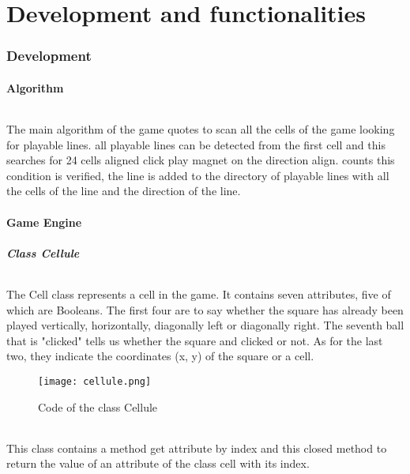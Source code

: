 \documentclass{article}
\begin{document}
\part{Development and functionalities}
\section{Development}
\subsection{Algorithm}
\paragraph{}
\setlength{\parindent}{2cm}
The main algorithm of the game quotes to scan all the cells of the game looking for playable lines. all playable lines can be detected from the first cell and this searches for 24 cells aligned click play magnet on the direction align. counts this condition is verified, the line is added to the directory of playable lines with all the cells of the line and the direction of the line.

\subsection{Game Engine}
\subsubsection{Class Cellule}
\paragraph{}
\setlength{\parindent}{2cm}
 The Cell class represents a cell in the game. It contains seven attributes, five of which are Booleans. The first four are to say whether the square has already been played vertically, horizontally, diagonally left or diagonally right. The seventh ball that is "clicked" tells us whether the square and clicked or not.   As for the last two, they indicate the coordinates (x, y) of the square or a cell. 
\begin{figure}[!h]
\centering
\texttt{[image: cellule.png]}
\\%
\caption{Code of the class Cellule}
\end{figure}

 \paragraph{}
\setlength{\parindent}{2cm}
This class contains a method get attribute by index and this closed method to return the value of an attribute of the class cell with its index.
\end{document}
